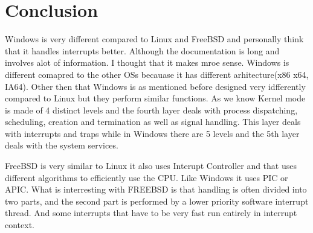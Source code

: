 \documentclass[letterpaper,10pt,draftclsnofoot,onecolumn]{IEEEtran}
\begin{document}
\section*{Conclusion}

Windows is very different compared to Linux and FreeBSD and personally think that it handles interrupts better. Although the documentation is long and involves alot of information. I thought that it makes mroe sense. Windows is different comapred to the other OSs becauase it has different arhitecture(x86 x64, IA64). Other then that Windows is as mentioned before designed very idfferently compared to Linux but they perform similar functions. As we know Kernel mode is made of 4 distinct levels and the fourth layer deals with process dispatching, scheduling, creation and termination as well as signal handling. This layer deals with interrupts and traps while in Windows there are 5 levels and the 5th layer deals with the system services.

FreeBSD is very similar to Linux it also uses Interupt Controller and that uses different algorithms to efficiently use the CPU. Like Windows it uses PIC or APIC. What is interresting with FREEBSD is that handling is often divided into two parts, and the second part is performed by a lower priority software interrupt thread. And some interrupts that have to be very fast run entirely in interrupt context.



\end{document}
